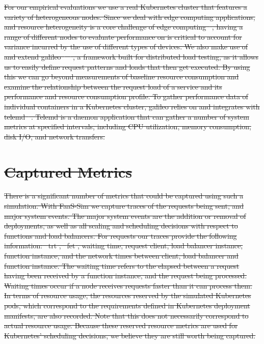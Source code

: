\documentclass[draft,final]{vutinfth} %
\providecommand{\DIFdeltex}[1]{{\protect\color{red}\sout{#1}}}                      %
\providecommand{\DIFdel}[1]{\texorpdfstring{\DIFdeltex{#1}}{}} %
\begin{document}
\DIFdel{For our empirical evaluations we use a real Kubernetes cluster that features a variety of heterogeneous nodes.
Since we deal with edge computing applications, and resource heterogeneity is a core challenge of edge computing\mbox{%
\cite{shiEdgeComputingVisionChallenges2016}}\hskip0pt%
, having a range of different nodes to evaluate performance on is critical to account for variance incurred by the use of different types of devices.
We also make use of and extend galileo\mbox{%
\cite{galileo-github}}\hskip0pt%
\mbox{%
\cite{operating-energy-aware-galileo}}\hskip0pt%
, a framework built for distributed load testing, as it allows us to easily define request patterns and loads that then get executed.
By using this we can go beyond measurements of baseline resource consumption and examine the relationship between the request load of a service and its performance and resource consumption profile.
To gather performance data of individual containers in a Kubernetes cluster, galileo relies on and integrates with telemd\mbox{%
\cite{telemd-github}}\hskip0pt%
.
Telemd is a daemon application that can gather a number of system metrics at specified intervals, including CPU utilization, memory consumption, disk I/O, and network transfers.
}%

\section{\DIFdel{Captured Metrics}}
\addtocounter{section}{-1}%
\DIFdel{There is a significant number of metrics that could be captured using such a simulation. With FaaS-Sim we capture traces of the requests being sent, and major system events.
The major system events are the addition or removal of deployments, as well as all scaling and scheduling decisions with respect to functions and load balancers.
For requests our traces provide the following information: \mbox{%
\gls{trt}}\hskip0pt%
, \mbox{%
\gls{fet}}\hskip0pt%
, waiting time, request client, load balancer instance, function instance, and the network times between client, load balancer and function instance.
The waiting time refers to the elapsed between a request having been received by a function instance, and the request being processed.
Waiting times occur if a node receives requests faster than it can process them.
In terms of resource usage, the resources reserved by the simulated Kubernetes pods, which correspond to the requirements defined in Kubernetes deployment manifests, are also recorded.
Note that this does not necessarily correspond to actual resource usage.
Because these reserved resource metrics are used for Kubernetes' scheduling decisions, we believe they are still worth being captured.
}%
\end{document}
